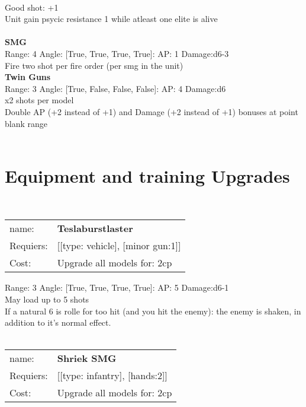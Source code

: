 \ \\
Good shot: +1\\ 
Unit gain psycic resistance 1 while atleast one elite is alive\\ 

\ \\
{\bf SMG } \\



Range: 4  Angle: [True, True, True, True]: AP: 1 Damage:d6-3 \\
Fire two shot per fire order (per smg in the unit)\\ 




{\bf Twin Guns } \\



Range: 3  Angle: [True, False, False, False]: AP: 4 Damage:d6 \\
x2 shots per model\\ 
Double AP (+2 instead of +1) and Damage (+2 instead of +1) bonuses at point blank range\\ 




 
\ \\

\section{Equipment and training Upgrades}\ \\
\begin{tabular}{ll}
name: & {\bf Teslaburstlaster } \\
Requiers: & [[type: vehicle], [minor gun:1]] \\
Cost: & Upgrade all models for: 2cp \\
\end{tabular}



Range: 3  Angle: [True, True, True, True]: AP: 5 Damage:d6-1 \\
May load up to 5 shots\\ 
If a natural 6 is rolle for too hit (and you hit the enemy): the enemy is shaken, in addition to it's normal effect.\\ 








\ \\
\begin{tabular}{ll}
name: & {\bf Shriek SMG } \\
Requiers: & [[type: infantry], [hands:2]] \\
Cost: & Upgrade all models for: 2cp \\
\end{tabular}



